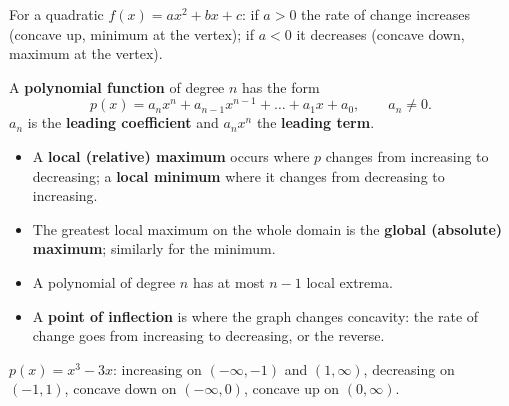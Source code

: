 \documentclass[11pt]{article}
\begin{document}
For a quadratic $f(x)=ax^2+bx+c$: if $a>0$ the rate of change increases (concave up, minimum at the vertex); if $a<0$ it decreases (concave down, maximum at the vertex).

A \textbf{polynomial function} of degree $n$ has the form
\[ p(x)=a_nx^n+a_{n-1}x^{n-1}+\dots+a_1x+a_0,\qquad a_n\neq 0. \]
$a_n$ is the \textbf{leading coefficient} and $a_nx^n$ the \textbf{leading term}.

\begin{keyidea}
\begin{itemize}
\item A \textbf{local (relative) maximum} occurs where $p$ changes from increasing to decreasing; a \textbf{local minimum} where it changes from decreasing to increasing.
\item The greatest local maximum on the whole domain is the \textbf{global (absolute) maximum}; similarly for the minimum.
\item A polynomial of degree $n$ has at most $n-1$ local extrema.
\item A \textbf{point of inflection} is where the graph changes concavity: the rate of change goes from increasing to decreasing, or the reverse.
\end{itemize}
\end{keyidea}

\begin{center}

{\small $p(x)=x^3-3x$: increasing on $(-\infty,-1)$ and $(1,\infty)$, decreasing on $(-1,1)$, concave down on $(-\infty,0)$, concave up on $(0,\infty)$.}
\end{center}
\end{document}
